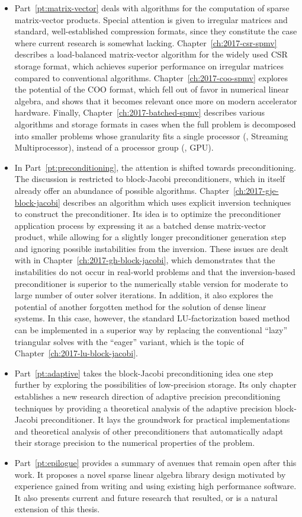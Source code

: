 \begin{itemize}
\item Part~\ref{pt:matrix-vector} deals with algorithms for the computation of
sparse matrix-vector products. Special attention is given to irregular matrices
and standard, well-established compression formats, since they constitute the
case where current research is somewhat lacking. Chapter~\ref{ch:2017-csr-spmv}
describes a load-balanced matrix-vector algorithm for the widely used CSR
storage format, which achieves superior performance on irregular matrices
compared to conventional algorithms. Chapter~\ref{ch:2017-coo-spmv} explores the
potential of the COO format, which fell out of favor in numerical linear
algebra, and shows that it becomes relevant once more on modern accelerator
hardware. Finally, Chapter~\ref{ch:2017-batched-spmv} describes various
algorithms and storage formats in cases when the full problem is decomposed into
smaller problems whose granularity fits a single processor (\ie, Streaming
Multiprocessor), instead of a processor group (\ie, GPU).
\item In Part~\ref{pt:preconditioning}, the attention is shifted towards
preconditioning. The discussion is restricted to block-Jacobi preconditioners,
which in itself already offer an abundance of possible algorithms.
Chapter~\ref{ch:2017-gje-block-jacobi} describes an algorithm which uses
explicit inversion techniques to construct the preconditioner. Its idea is to
optimize the preconditioner application process by expressing it as a batched
dense matrix-vector product, while allowing for a slightly longer preconditioner
generation step and ignoring possible instabilities from the inversion. These
issues are dealt with in Chapter~\ref{ch:2017-gh-block-jacobi}, which
demonstrates that the instabilities do not occur in real-world problems and that
the inversion-based preconditioner is superior to the numerically stable version
for moderate to large number of outer solver iterations. In addition, it also
explores the potential of another forgotten method for the solution of dense
linear systems. In this case, however, the standard LU-factorization based
method can be implemented in a superior way by replacing the conventional
``lazy'' triangular solves with the ``eager'' variant, which is the topic of
Chapter~\ref{ch:2017-lu-block-jacobi}.
\item Part~\ref{pt:adaptive} takes the block-Jacobi preconditioning idea one
step further by exploring the possibilities of low-precision storage. Its only
chapter establishes a new research direction of adaptive precision
preconditioning techniques by providing a theoretical analysis of the adaptive
precision block-Jacobi preconditioner. It lays the groundwork for practical
implementations and theoretical analysis of other preconditioners that
automatically adapt their storage precision to the numerical properties of the
problem.
\item Part~\ref{pt:epilogue} provides a summary of avenues that remain open
after this work. It proposes a novel sparse linear algebra library design
motivated by experience gained from writing and using existing high performance
software. It also presents current and future research that resulted, or is a
natural extension of this thesis.
\end{itemize}
